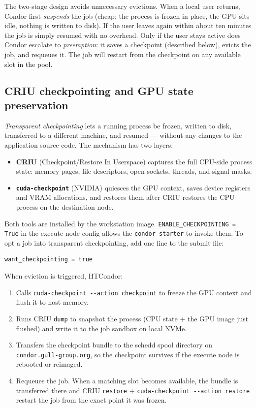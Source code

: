 \documentclass[11pt,a4paper]{article}
\begin{document}
The two-stage design avoids unnecessary evictions.  When a local user returns,
Condor first \emph{suspends} the job (cheap: the process is frozen in place,
the GPU sits idle, nothing is written to disk).  If the user leaves again
within about ten minutes the job is simply resumed with no overhead.  Only if
the user stays active does Condor escalate to \emph{preemption}: it saves a
checkpoint (described below), evicts the job, and requeues it.  The job will
restart from the checkpoint on any available slot in the pool.

\subsection{CRIU checkpointing and GPU state preservation}
\label{sec:checkpointing}

\emph{Transparent checkpointing} lets a running process be frozen, written to
disk, transferred to a different machine, and resumed --- without any changes to
the application source code.  The mechanism has two layers:

\begin{itemize}
  \item \textbf{CRIU} (Checkpoint/Restore In Userspace) captures the full
        CPU-side process state: memory pages, file descriptors, open sockets,
        threads, and signal masks.
  \item \textbf{\texttt{cuda-checkpoint}} (NVIDIA) quiesces the GPU context,
        saves device registers and VRAM allocations, and restores them after
        CRIU restores the CPU process on the destination node.
\end{itemize}

Both tools are installed by the workstation image.
\texttt{ENABLE\_CHECKPOINTING = True} in the execute-node config allows the
\texttt{condor\_starter} to invoke them.  To opt a job into transparent
checkpointing, add one line to the submit file:

\begin{verbatim}
want_checkpointing = true
\end{verbatim}

When eviction is triggered, HTCondor:
\begin{enumerate}
  \item Calls \texttt{cuda-checkpoint -{}-action checkpoint} to freeze the GPU
        context and flush it to host memory.
  \item Runs CRIU \texttt{dump} to snapshot the process (CPU state + the GPU
        image just flushed) and write it to the job sandbox on local NVMe.
  \item Transfers the checkpoint bundle to the schedd spool directory on
        \texttt{condor.gull-group.org}, so the checkpoint survives if the execute
        node is rebooted or reimaged.
  \item Requeues the job.  When a matching slot becomes available, the bundle is
        transferred there and CRIU \texttt{restore} + \texttt{cuda-checkpoint
        -{}-action restore} restart the job from the exact point it was frozen.
\end{enumerate}
\end{document}

